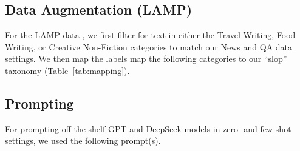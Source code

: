 \documentclass{article} %
\newcommand{\csnote}[1]{\textcolor{cspink}{CS: #1}}
\begin{document}
\subsection{Data Augmentation (LAMP)}
For the LAMP data \cite{chakrabarty2025ai}, we first filter for text in either the Travel Writing, Food Writing, or Creative Non-Fiction categories to match our News and QA data settings. We then map the labels  map the following categories to our ``slop'' taxonomy (Table~\ref{tab:mapping}).

\subsection{Prompting}
For prompting off-the-shelf GPT and DeepSeek models in zero- and few-shot settings, we used the following prompt(s). 
\end{document}
